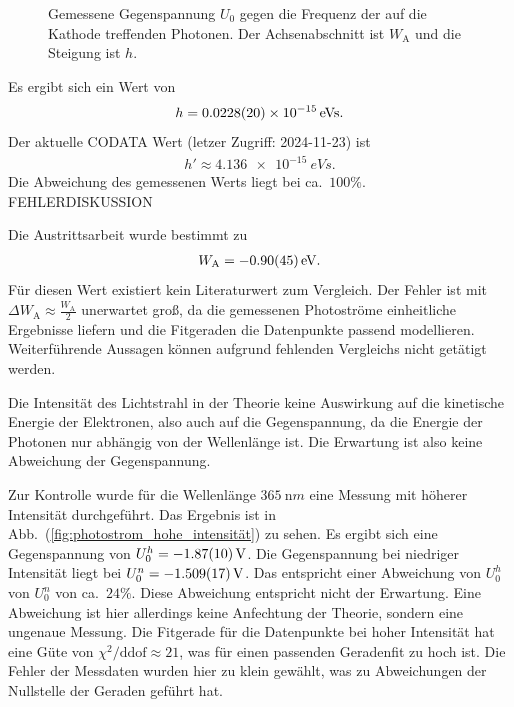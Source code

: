\documentclass[sn-mathphys-num,iicol]{sn-jnl}
\theoremstyle{thmstyleone}
\theoremstyle{thmstyletwo}
\theoremstyle{thmstylethree}
\begin{document}
\begin{figure}[t]
        \centering
        \resizebox{.5\textwidth}{!}{}
        \caption{Gemessene Gegenspannung $U_0$ gegen die Frequenz der auf die Kathode treffenden Photonen. Der Achsenabschnitt ist $W_\text{A}$ und die Steigung ist $h$.} \label{fig:austrittsarbeit}
\end{figure}
Es ergibt sich ein Wert von
\begin{align} 
        h=\SI{0.0228+-0.002e-15}{eVs}
.\end{align} 
Der aktuelle CODATA Wert (letzer Zugriff: 2024-11-23) ist
\begin{align} 
        h'\approx \SI{4.136e-15}{eVs}
.\end{align} 
Die Abweichung des gemessenen Werts liegt bei ca.\ $100\%$.
FEHLERDISKUSSION

Die Austrittsarbeit wurde bestimmt zu
\begin{align} 
        W_\text{A}=\SI{-0.90+-0.45}{eV}
.\end{align} 
Für diesen Wert existiert kein Literaturwert zum Vergleich.
Der Fehler ist mit $\Delta W_\text{A}\approx \tfrac{W_\text{A}}{2}$ unerwartet groß, da die gemessenen Photoströme einheitliche Ergebnisse liefern und die Fitgeraden die Datenpunkte passend modellieren.
Weiterführende Aussagen können aufgrund fehlenden Vergleichs nicht getätigt werden.

Die Intensität des Lichtstrahl in der Theorie keine Auswirkung auf die kinetische Energie der Elektronen, also auch auf die Gegenspannung, da die Energie der Photonen nur abhängig von der Wellenlänge ist.
Die Erwartung ist also keine Abweichung der Gegenspannung.

Zur Kontrolle wurde für die Wellenlänge $\SI{365}{\nano m}$ eine Messung mit höherer Intensität durchgeführt.
Das Ergebnis ist in Abb.\ (\ref{fig:photostrom_hohe_intensität}) zu sehen.
Es ergibt sich eine Gegenspannung von $U_0^h=-\SI{1.87+-.1}{V}$.
Die Gegenspannung bei niedriger Intensität liegt bei $U_0^n=\SI{-1.509+-.017}{V}$.
Das entspricht einer Abweichung von $U_0^h$ von $U_0^n$ von ca.\ $24\%$.
Diese Abweichung entspricht nicht der Erwartung.
Eine Abweichung ist hier allerdings keine Anfechtung der Theorie, sondern eine ungenaue Messung.
Die Fitgerade für die Datenpunkte bei hoher Intensität hat eine Güte von $\chi ^2/\text{ddof}\approx 21$, was für einen passenden Geradenfit zu hoch ist.
Die Fehler der Messdaten wurden hier zu klein gewählt, was zu Abweichungen der Nullstelle der Geraden geführt hat.
\end{document}
